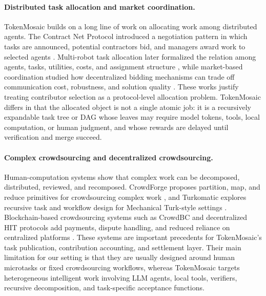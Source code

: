 \documentclass{article}
\theoremstyle{plain}
\begin{document}
\paragraph{Distributed task allocation and market coordination.}
TokenMosaic builds on a long line of work on allocating work among distributed agents. The Contract Net Protocol introduced a negotiation pattern in which tasks are announced, potential contractors bid, and managers award work to selected agents \citep{smith1980contract}. Multi-robot task allocation later formalized the relation among agents, tasks, utilities, costs, and assignment structure \citep{gerkey2004formal}, while market-based coordination studied how decentralized bidding mechanisms can trade off communication cost, robustness, and solution quality \citep{dias2006market}. These works justify treating contributor selection as a protocol-level allocation problem. TokenMosaic differs in that the allocated object is not a single atomic job: it is a recursively expandable task tree or DAG whose leaves may require model tokens, tools, local computation, or human judgment, and whose rewards are delayed until verification and merge succeed.

\paragraph{Complex crowdsourcing and decentralized crowdsourcing.}
Human-computation systems show that complex work can be decomposed, distributed, reviewed, and recomposed. CrowdForge proposes partition, map, and reduce primitives for crowdsourcing complex work \citep{kittur2011crowdforge}, and Turkomatic explores recursive task and workflow design for Mechanical Turk-style settings \citep{kulkarni2011turkomatic}. Blockchain-based crowdsourcing systems such as CrowdBC and decentralized HIT protocols add payments, dispute handling, and reduced reliance on centralized platforms \citep{li2018crowdbc,liang2022decentralizedhit}. These systems are important precedents for TokenMosaic's task publication, contribution accounting, and settlement layer. Their main limitation for our setting is that they are usually designed around human microtasks or fixed crowdsourcing workflows, whereas TokenMosaic targets heterogeneous intelligent work involving LLM agents, local tools, verifiers, recursive decomposition, and task-specific acceptance functions.
\end{document}
